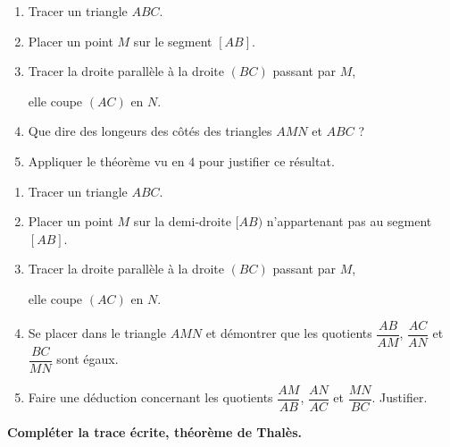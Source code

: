 \begin{activite}
        \begin{minipage}{0.6\textwidth}
            \begin{enumerate}
                \item Tracer un triangle $ABC$.
                \item Placer un point $M$ sur le segment $[AB]$.
                \item Tracer la droite parallèle à la droite $(BC)$ passant par $M$,
                
                elle coupe $(AC)$ en $N$.
                \item Que dire des longeurs des côtés des triangles $AMN$ et $ABC$ ?
                \item Appliquer le théorème vu en $4$ pour justifier ce résultat.
            \end{enumerate}
        \end{minipage}
        \hspace*{1cm}
        \begin{minipage}{0.4\textwidth}
        \end{minipage}

    \partie[Configuration emboîtée - {$M \in [AB)$ ; $M \notin [AB]$}]
        \begin{minipage}{0.6\textwidth}
            \begin{enumerate}
                \item Tracer un triangle $ABC$.
                \item Placer un point $M$ sur la demi-droite $[AB)$ n'appartenant pas au segment $[AB]$.
                \item Tracer la droite parallèle à la droite $(BC)$ passant par $M$,
                
                elle coupe $(AC)$ en $N$.
                \item Se placer dans le triangle $AMN$ et démontrer que les quotients
                $\dfrac{AB}{AM}$, $\dfrac{AC}{AN}$ et $\dfrac{BC}{MN}$ sont égaux.
                \item Faire une déduction concernant les quotients $\dfrac{AM}{AB}$, $\dfrac{AN}{AC}$ et $\dfrac{MN}{BC}$. Justifier.
            \end{enumerate}
        \end{minipage}
        \hspace*{1cm}
        \begin{minipage}{0.4\textwidth}
        \end{minipage}

        \textbf{Compléter la trace écrite, théorème de Thalès.}
\end{activite}